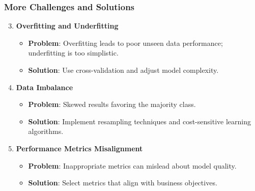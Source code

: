 \documentclass[aspectratio=169]{beamer}
\begin{document}
\begin{frame}[fragile]
    \frametitle{More Challenges and Solutions}
    
    \begin{enumerate}
        \setcounter{enumi}{2}
        \item \textbf{Overfitting and Underfitting}
        \begin{itemize}
            \item \textbf{Problem}: Overfitting leads to poor unseen data performance; underfitting is too simplistic.
            \item \textbf{Solution}: Use cross-validation and adjust model complexity.
        \end{itemize}
        
        \item \textbf{Data Imbalance}
        \begin{itemize}
            \item \textbf{Problem}: Skewed results favoring the majority class.
            \item \textbf{Solution}: Implement resampling techniques and cost-sensitive learning algorithms.
        \end{itemize}
        
        \item \textbf{Performance Metrics Misalignment}
        \begin{itemize}
            \item \textbf{Problem}: Inappropriate metrics can mislead about model quality.
            \item \textbf{Solution}: Select metrics that align with business objectives.
        \end{itemize}
    \end{enumerate}
\end{frame}
\end{document}
